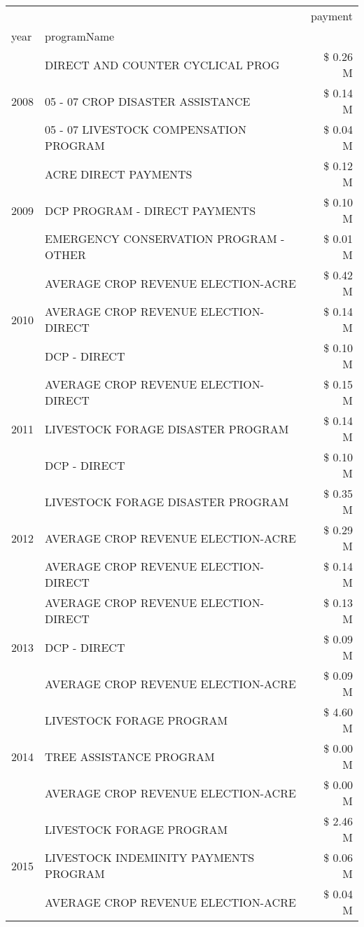 \begin{tabular}{llr}
\toprule
 &  & payment \\
year & programName &  \\
\midrule
\multirow[t]{3}{*}{2008} & DIRECT AND COUNTER CYCLICAL PROG & \$ 0.26 M \\
 & 05 - 07 CROP DISASTER ASSISTANCE & \$ 0.14 M \\
 & 05 - 07 LIVESTOCK COMPENSATION PROGRAM & \$ 0.04 M \\
\cline{1-3}
\multirow[t]{3}{*}{2009} & ACRE DIRECT PAYMENTS & \$ 0.12 M \\
 & DCP PROGRAM - DIRECT PAYMENTS & \$ 0.10 M \\
 & EMERGENCY CONSERVATION PROGRAM - OTHER & \$ 0.01 M \\
\cline{1-3}
\multirow[t]{3}{*}{2010} & AVERAGE CROP REVENUE ELECTION-ACRE & \$ 0.42 M \\
 & AVERAGE CROP REVENUE ELECTION-DIRECT & \$ 0.14 M \\
 & DCP - DIRECT & \$ 0.10 M \\
\cline{1-3}
\multirow[t]{3}{*}{2011} & AVERAGE CROP REVENUE ELECTION-DIRECT & \$ 0.15 M \\
 & LIVESTOCK FORAGE DISASTER PROGRAM & \$ 0.14 M \\
 & DCP - DIRECT & \$ 0.10 M \\
\cline{1-3}
\multirow[t]{3}{*}{2012} & LIVESTOCK FORAGE DISASTER PROGRAM & \$ 0.35 M \\
 & AVERAGE CROP REVENUE ELECTION-ACRE & \$ 0.29 M \\
 & AVERAGE CROP REVENUE ELECTION-DIRECT & \$ 0.14 M \\
\cline{1-3}
\multirow[t]{3}{*}{2013} & AVERAGE CROP REVENUE ELECTION-DIRECT & \$ 0.13 M \\
 & DCP - DIRECT & \$ 0.09 M \\
 & AVERAGE CROP REVENUE ELECTION-ACRE & \$ 0.09 M \\
\cline{1-3}
\multirow[t]{3}{*}{2014} & LIVESTOCK FORAGE PROGRAM & \$ 4.60 M \\
 & TREE ASSISTANCE PROGRAM & \$ 0.00 M \\
 & AVERAGE CROP REVENUE ELECTION-ACRE & \$ 0.00 M \\
\cline{1-3}
\multirow[t]{3}{*}{2015} & LIVESTOCK FORAGE PROGRAM & \$ 2.46 M \\
 & LIVESTOCK INDEMINITY PAYMENTS PROGRAM & \$ 0.06 M \\
 & AVERAGE CROP REVENUE ELECTION-ACRE & \$ 0.04 M \\

\end{tabular}
